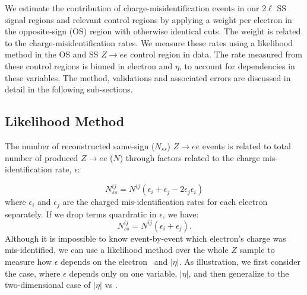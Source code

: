 We estimate the contribution of charge-misidentification events in our 2$\ell$ SS signal regions and relevant control regions by applying a weight per electron in the opposite-sign (OS) region with otherwise identical cuts. The weight is related to the charge-misidentification rates. We measure these rates using a likelihood method in the OS and SS $Z\rightarrow ee$ control region in data. The rate measured from these control regions is binned in electron \pt and $\eta$, to account for dependencies in these variables. The method, validations and associated errors are discussed in detail in the following sub-sections.


\subsection{Likelihood Method}

The number of reconstructed same-sign ($N_{ss}$) $Z\rightarrow ee$ events is related to total number of produced $Z\rightarrow ee$ ($N$) through factors related to the charge mis-identification rate, $\epsilon$: 

\begin{equation}
N^{ij}_{ss} = N^{ij}(\epsilon_i + \epsilon_j - 2\epsilon_j\epsilon_i)
\end{equation}
where $\epsilon_i$ and $\epsilon_j$ are the charged mis-identification rates for each electron separately. If we drop terms quardratic in $\epsilon$, we have:
\begin{equation}
N^{ij}_{ss}=N^{ij}(\epsilon_i+\epsilon_j).
\end{equation}
Although it is impossible to know event-by-event which electron's charge was mis-identified, we can use a likelihood method over the whole $Z$ sample to measure how $\epsilon$ depends on the electron \pt\ and $|\eta|$. As illustration, we first consider the case, where $\epsilon$ depends only on one variable, $|\eta|$, and then generalize to the two-dimensional case of $|\eta|$ vs \pt. 

